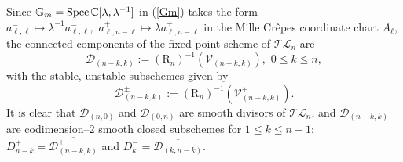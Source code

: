 \documentclass[10pt]{amsart}
\theoremstyle{definition}
\newcommand{\RL}{\mathrm{R}}
\theoremstyle{plain} %
\begin{document}
Since $\mathbb G_m={\rm Spec}\,\mathbb C[\lambda,\lambda^{-1}]$ in (\ref{Gm}) takes the form $a^-_{\ell,\ell}\mapsto \lambda^{-1} a^-_{\ell,\ell},\,\,a^+_{\ell,n-\ell}\mapsto \lambda a^+_{\ell,n-\ell}$ in the Mille Cr\^epes coordinate chart $A_{\ell}$, the connected components of the fixed point scheme of $\mathcal {TL}_{n}$ are 
\begin{equation*}%
\mathcal D_{(n-k,k)}:=(\RL_{n})^{-1}(\mathcal V_{(n-k,k)}), \,\,0\leq k\leq n,
\end{equation*}
with the stable, unstable subschemes given by
\begin{equation*}%
\mathcal D^{\pm}_{(n-k,k)}:=(\RL_{n})^{-1}(\mathcal V^{\pm}_{(n-k,k)}).
\end{equation*}
It is clear that $\mathcal D_{(n,0)}$ and $\mathcal D_{(0,n)}$ are smooth divisors of $\mathcal {TL}_{n}$, and  $\mathcal D_{(n-k,k)}$ are codimension--$2$ smooth closed subschemes for $1\leq k\leq n-1$;  $D_{n-k}^+=\overline{\mathcal D_{(n-k,k)}^+}$ and $D_{k}^-=\overline{\mathcal D_{(k,n-k)}^-}$.
\end{document}
